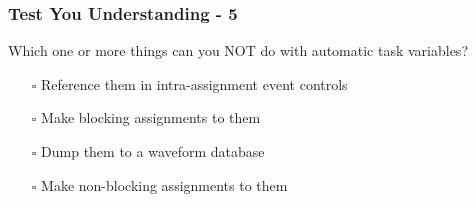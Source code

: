 \documentclass[t, notes, xcolor=table]{beamer}
\begin{document}
\begin{frame}
\frametitle{Test You Understanding - 5}
Which one or more things can you NOT do with automatic task variables?
\begin{itemize}
\item[$\square$] Reference them in intra-assignment event controls
\item[$\square$] Make blocking assignments to them
\item[$\square$] Dump them to a waveform database
\item[$\square$] Make non-blocking assignments to them
\end{itemize}
\end{frame}
\end{document}
